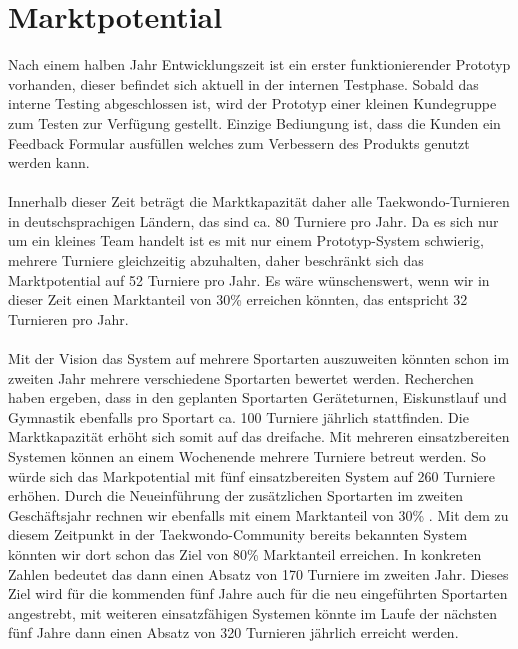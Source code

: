\section{Marktpotential}\label{marktpotential}

Nach einem halben Jahr Entwicklungszeit ist ein erster funktionierender Prototyp vorhanden, dieser befindet sich aktuell in
der internen Testphase.
Sobald das interne Testing abgeschlossen ist, wird der Prototyp einer kleinen Kundegruppe zum Testen zur Verfügung gestellt.
Einzige Bediungung ist, dass die Kunden ein Feedback Formular ausfüllen welches zum Verbessern des Produkts genutzt werden kann.
\\\\
Innerhalb dieser Zeit beträgt die Marktkapazität daher alle Taekwondo-Turnieren in deutschsprachigen Ländern, das
sind ca. 80 Turniere pro Jahr.
Da es sich nur um ein kleines Team handelt ist es mit nur einem Prototyp-System schwierig, mehrere Turniere
	gleichzeitig abzuhalten, daher beschränkt sich das Marktpotential auf 52 Turniere pro Jahr.
Es wäre wünschenswert, wenn wir in dieser Zeit einen Marktanteil von 30\% erreichen könnten, das entspricht 32
	Turnieren pro Jahr.
\\\\
Mit der Vision das System auf mehrere Sportarten auszuweiten könnten schon im zweiten Jahr mehrere verschiedene
	Sportarten bewertet werden.
Recherchen haben ergeben, dass in den geplanten Sportarten Geräteturnen, Eiskunstlauf und Gymnastik ebenfalls pro
	Sportart ca. 100 Turniere jährlich stattfinden.
Die Marktkapazität erhöht sich somit auf das dreifache.
Mit mehreren einsatzbereiten Systemen können an einem Wochenende mehrere Turniere betreut werden.
So würde sich das Markpotential mit fünf einsatzbereiten System auf 260 Turniere erhöhen.
Durch die Neueinführung der zusätzlichen Sportarten im zweiten Geschäftsjahr rechnen wir ebenfalls mit einem
	Marktanteil von 30\% .
Mit dem zu diesem Zeitpunkt in der Taekwondo-Community bereits bekannten System könnten wir dort schon das Ziel von
	80\% Marktanteil erreichen.
In konkreten Zahlen bedeutet das dann einen Absatz von 170 Turniere im zweiten Jahr.
Dieses Ziel wird für die kommenden fünf Jahre auch für die neu eingeführten Sportarten angestrebt, mit weiteren
	einsatzfähigen Systemen könnte im Laufe der nächsten fünf Jahre dann einen Absatz von 320 Turnieren jährlich
	erreicht werden.

